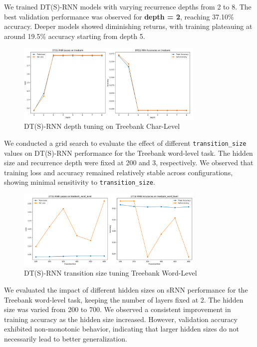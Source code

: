 \documentclass{article}
\begin{document}
We trained DT(S)-RNN models with varying recurrence depths from 2 to 8. The best validation performance was observed for \textbf{depth = 2}, reaching 37.10\% accuracy. Deeper models showed diminishing returns, with training plateauing at around 19.5\% accuracy starting from depth 5. 

\begin{figure}[H]
    \centering
    \includegraphics[width=0.8\textwidth]
    {treebank_charlevel_plots/dtsrnn_depth_treebank_charlevel.png}
    \caption{DT(S)-RNN depth tuning on Treebank Char-Level}
    \label{fig:DT(S)-RNN depth tuning}
\end{figure}


We conducted a grid search to evaluate the effect of different \texttt{transition\_size} values on DT(S)-RNN performance for the Treebank word-level task. The hidden size and recurrence depth were fixed at 200 and 3, respectively. We observed that training loss and accuracy remained relatively stable across configurations, showing minimal sensitivity to \texttt{transition\_size}.

\begin{figure}[H]
    \centering
    \includegraphics[width=0.8\textwidth]{treebank_wordlevel_plots/dtsrnn_transitionsize_treebank_wordlevel.png}
    \caption{DT(S)-RNN transition size tuning Treebank Word-Level}
    \label{fig:dtsrnn-transition-size-tuning}
\end{figure}


We evaluated the impact of different hidden sizes on sRNN performance for the Treebank word-level task, keeping the number of layers fixed at 2. The hidden size was varied from 200 to 700. We observed a consistent improvement in training accuracy as the hidden size increased. However, validation accuracy exhibited non-monotonic behavior, indicating that larger hidden sizes do not necessarily lead to better generalization.
\end{document}
